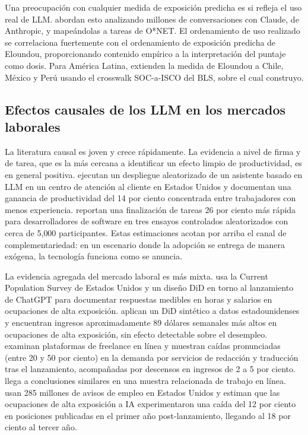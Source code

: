 Una preocupaci\'{o}n con cualquier medida de exposici\'{o}n predicha es si refleja el uso real de LLM. \citet{Handa2025_economic_tasks} abordan esto analizando millones de conversaciones con Claude, de Anthropic, y mape\'{a}ndolas a tareas de O*NET. El ordenamiento de uso realizado se correlaciona fuertemente con el ordenamiento de exposici\'{o}n predicha de Eloundou, proporcionando contenido emp\'{i}rico a la interpretaci\'{o}n del puntaje como dosis. Para Am\'{e}rica Latina, \citet{Azuara2024_idb_ai} extienden la medida de Eloundou a Chile, M\'{e}xico y Per\'{u} usando el crosswalk SOC-a-ISCO del BLS, sobre el cual construyo.

\subsection{Efectos causales de los LLM en los mercados laborales}
\label{subsec:lit_causal}

La literatura causal es joven y crece r\'{a}pidamente. La evidencia a nivel de firma y de tarea, que es la m\'{a}s cercana a identificar un efecto limpio de productividad, es en general positiva. \citet{Brynjolfsson2023_genai} ejecutan un despliegue aleatorizado de un asistente basado en LLM en un centro de atenci\'{o}n al cliente en Estados Unidos y documentan una ganancia de productividad del 14 por ciento concentrada entre trabajadores con menos experiencia. \citet{CuiDemirerJaffe2025_copilot} reportan una finalizaci\'{o}n de tareas 26 por ciento m\'{a}s r\'{a}pida para desarrolladores de software en tres ensayos controlados aleatorizados con cerca de 5{,}000 participantes. Estas estimaciones acotan por arriba el canal de complementariedad: en un escenario donde la adopci\'{o}n se entrega de manera ex\'{o}gena, la tecnolog\'{i}a funciona como se anuncia.

La evidencia agregada del mercado laboral es m\'{a}s mixta. \citet{Hartley2024_labor_effects} usa la Current Population Survey de Estados Unidos y un dise\~{n}o DiD en torno al lanzamiento de ChatGPT para documentar respuestas medibles en horas y salarios en ocupaciones de alta exposici\'{o}n. \citet{Chen2025_llm_unemployment} aplican un DiD sint\'{e}tico a datos estadounidenses y encuentran ingresos aproximadamente 89 d\'{o}lares semanales m\'{a}s altos en ocupaciones de alta exposici\'{o}n, sin efecto detectable sobre el desempleo. \citet{Hui2024_online_labor} examinan plataformas de freelance en l\'{i}nea y muestran ca\'{i}das pronunciadas (entre 20 y 50 por ciento) en la demanda por servicios de redacci\'{o}n y traducci\'{o}n tras el lanzamiento, acompa\~{n}adas por descensos en ingresos de 2 a 5 por ciento. \citet{Liu2025_generate_future} llega a conclusiones similares en una muestra relacionada de trabajo en l\'{i}nea. \citet{LiuWangYu2025_labor_demand} usan 285 millones de avisos de empleo en Estados Unidos y estiman que las ocupaciones de alta exposici\'{o}n a IA experimentaron una ca\'{i}da del 12 por ciento en posiciones publicadas en el primer a\~{n}o post-lanzamiento, llegando al 18 por ciento al tercer a\~{n}o.

